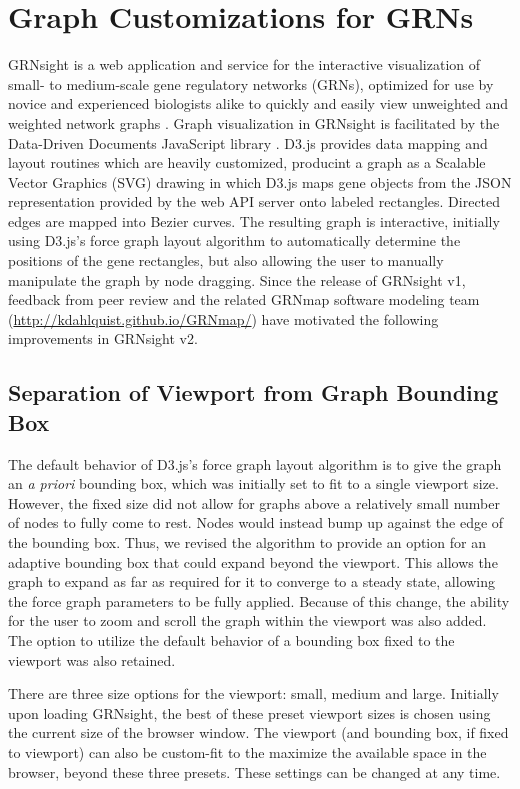 \documentclass[sigconf,review]{acmart}
\begin{document}
\section{Graph Customizations for GRNs}

GRNsight is a web application and service for the interactive visualization of small- to medium-scale gene regulatory networks (GRNs), optimized for use by novice and experienced biologists alike to quickly and easily view unweighted and weighted network graphs \cite{peerj}. Graph visualization in GRNsight is facilitated by the Data-Driven Documents JavaScript library \cite{d3}. D3.js provides data mapping and layout routines which are heavily customized, producint a graph as a Scalable Vector Graphics (SVG) drawing in which D3.js maps gene objects from the JSON representation provided by the web API server onto labeled rectangles. Directed edges are mapped into Bezier curves. The resulting graph is interactive, initially using D3.js's force graph layout algorithm to automatically determine the positions of the gene rectangles, but also allowing the user to manually manipulate the graph by node dragging. Since the release of GRNsight v1, feedback from peer review and the related GRNmap software modeling team (\url{http://kdahlquist.github.io/GRNmap/}) have motivated the following improvements in GRNsight v2.

\subsection{Separation of Viewport from Graph Bounding Box}
The default behavior of D3.js's force graph layout algorithm is to give the graph an \emph{a priori} bounding box, which was initially set to fit to a single viewport size. However, the fixed size did not allow for graphs above a relatively small number of nodes to fully come to rest. Nodes would instead bump up against the edge of the bounding box. Thus, we revised the algorithm to provide an option for an adaptive bounding box that could expand beyond the viewport. This allows the graph to expand as far as required for it to converge to a steady state, allowing the force graph parameters to be fully applied. Because of this change, the ability for the user to zoom and scroll the graph within the viewport was also added. The option to utilize the default behavior of a bounding box fixed to the viewport was also retained.

There are three size options for the viewport: small, medium and large. Initially upon loading GRNsight, the best of these preset viewport sizes is chosen using the current size of the browser window. The viewport (and bounding box, if fixed to viewport) can also be custom-fit to the maximize the available space in the browser, beyond these three presets. These settings can be changed at any time. 
\end{document}
